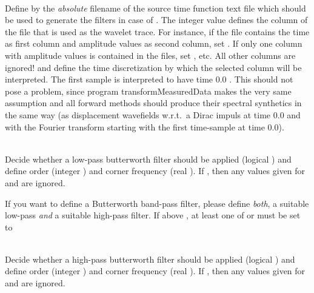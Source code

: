 \textbf{}\\
Define by  the \emph{absolute} filename of the source time function text file which should be 
used to generate the filters in case of  . 
The integer value  defines the column of the file that is used as the wavelet trace.
For instance, if the file contains the time as first column and amplitude values as second column, set
 . If only one column with amplitude values is contained in the files, set 
, etc. All other columns are ignored!
 and  define the time discretization by which the selected column will be interpreted.
The first sample is interpreted to have time $0.0$ . This should not pose a problem, since program
transformMeasuredData makes the very same assumption and all forward methods should produce their 
spectral synthetics in the same way (as displacement wavefields w.r.t.\ a Dirac impuls at time 0.0
and with the Fourier transform starting with the first time-sample at time 0.0).

\textbf{}\\
Decide whether a low-pass butterworth filter should be applied (logical ) and 
define order (integer ) and corner frequency (real ).
If , then any values given for  and 
 are ignored.

If you want to define a Butterworth band-pass filter, please define \emph{both}, a suitable low-pass \emph{and} 
a suitable high-pass filter. If above  , at least 
one of  or  must be set to  

\textbf{}\\
Decide whether a high-pass butterworth filter should be applied (logical ) and 
define order (integer ) and corner frequency (real ).
If , then any values given for  and 
 are ignored.

